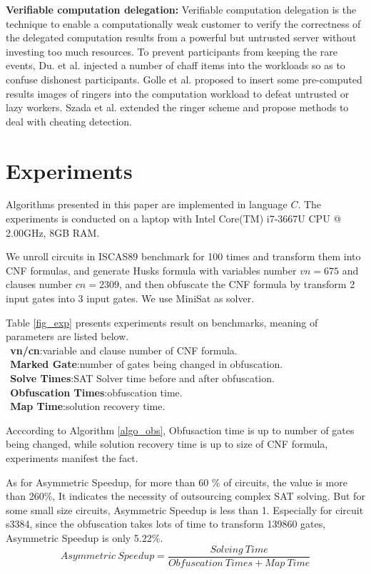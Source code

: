 \documentclass[conference,compsocconf]{IEEEtran}
\begin{document}
\textbf{Verifiable computation delegation:}
Verifiable computation delegation is the technique to enable
a computationally weak customer to verify the correctness of the delegated computation results
from a powerful but untrusted server without investing too much resources.
To prevent participants from keeping the rare events,
Du. et al. \cite{HV-grid} injected a number of chaff items into the workloads so as to confuse dishonest participants.
Golle et al. \cite{t32} proposed to insert some pre-computed results images of ringers
into the computation workload to defeat untrusted or lazy workers.
Szada et al. \cite{t33} extended the ringer scheme and propose methods
to deal with cheating detection.

\section{Experiments}
Algorithms presented in this paper are implemented in language $C$.
The experiments is conducted on a laptop with Intel Core(TM) i7-3667U CPU @ 2.00GHz, 8GB RAM.

We unroll circuits in ISCAS89 benchmark for 100 times and transform them into CNF formulas,
and generate Husks formula with variables number $vn=675$ and clauses number $cn=2309$,
and then obfuscate the CNF formula by transform 2 input gates into 3 input gates.
We use MiniSat as solver.

Table \ref{fig_exp} presents experiments result on benchmarks, meaning of parameters are listed below. \\
$~~$\textbf{vn/cn}:variable and clause number of CNF formula.\\
$~~$\textbf{Marked Gate}:number of gates being changed in obfuscation.\\
$~~$\textbf{Solve Times}:SAT Solver time before and after obfuscation.\\
$~~$\textbf{Obfuscation Times}:obfuscation time.\\
$~~$\textbf{Map Time}:solution recovery time.

Acccording to Algorithm \ref{algo_obs},
Obfusaction time is up to number of gates being changed, 
while solution recovery time is up to size of CNF formula,
experiments manifest the fact.

As for Asymmetric Speedup\cite{c.WANG}, for more than 60 \% of circuits, the value is more than 260\%,
It indicates the necessity of outsourcing complex SAT solving.
But for some small size circuits, 
Asymmetric Speedup is less than 1. 
Especially for circuit s3384, 
since the obfuscation takes lots of time to transform 139860 gates, Asymmetric Speedup is only 5.22\%.
\begin{equation}
 Asymmetric~Speedup= \frac{Solving~Time}{Obfuscation~Times + Map~Time} 
\end{equation}
\end{document}
